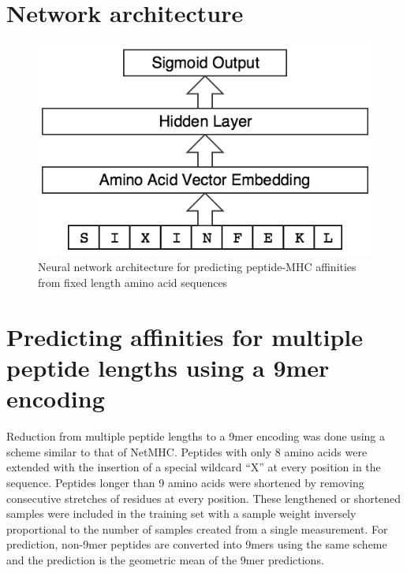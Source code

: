 
\section{Network architecture}

\begin{figure}[h]
\centering
\includegraphics[scale=0.5]{figures/mhcflurry-gliffy-network.png}
\caption{Neural network architecture for predicting peptide-MHC affinities from fixed length amino acid sequences}
\end{figure}

\section{Predicting affinities for multiple peptide lengths using a 9mer encoding}
Reduction from multiple peptide lengths to a 9mer encoding was done using a scheme similar to that of NetMHC\cite{lundegaard2008accurate}. Peptides with only 8 amino acids were extended with the insertion of a special wildcard ``X'' at every position in the sequence. Peptides longer than 9 amino acids were shortened by removing consecutive stretches of residues at every position. These lengthened or shortened samples were included in the training set with a sample weight inversely proportional to the number of samples created from a single measurement. For prediction, non-9mer peptides are converted into 9mers using the same scheme and the prediction is the geometric mean of the 9mer predictions.